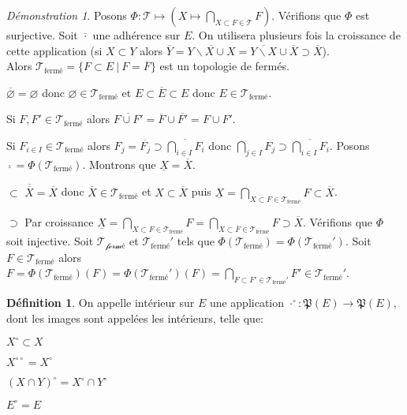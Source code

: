 \documentclass[a4paper, 11pt, french]{book}
\newenvironment{itemise}{\itemize}{\enditemize}
\theoremstyle{plain} %
\theoremstyle{definition} %
\newtheorem{definition}{Définition}
\theoremstyle{remark} %
\newtheorem*{demonstration}{Démonstration}
\renewcommand{\setminus}{\backslash}
\newcommand{\1}{\mathds{1}}
\newcommand\vide{\varnothing}
\newcommand\ens[2]{\{#1 \ |\ #2\}}
\begin{document}
\begin{demonstration}
	Posons $\Phi\colon\mathscr{T}\mapsto(X\mapsto\bigcap_{X\subset F\in\mathscr{T}}F)$.
	Vérifions que $\Phi$ est surjective.
	Soit $\overline{\cdot}$ une adhérence sur $E$.
	On utilisera plusieurs fois la croissance de cette application (si $X\subset Y$ alors $\overline{Y}=\overline{Y\setminus X\cup X}=\overline{Y\setminus X}\cup\overline{X}\supset\overline{X}$). \\
	Alors $\mathscr{T}_\text{fermé}=\ens{F\subset E}{F=\overline{F}}$ est un topologie de fermés.
	\begin{itemise}
		\item $\overline{\vide}=\vide$ donc $\vide\in\mathscr{T}_\text{fermé}$ et $E\subset\overline{E}\subset E$ donc $E\in\mathscr{T}_\text{fermé}$.
		\item Si $F, F'\in\mathscr{T}_\text{fermé}$ alors $\overline{F\cup F'}=\overline{F}\cup\overline{F'}=F\cup F'$.
		\item Si $F_{i\in I}\in\mathscr{T}_\text{fermé}$ alors $F_j=\overline{F_j}\supset\overline{\bigcap_{i\in I}F_i}$ donc $\bigcap_{j\in I}F_j\supset\overline{\bigcap_{i\in I}F_i}$.
	\end{itemise}
	Posons $\underline{\cdot}=\Phi(\mathscr{T}_\text{fermé})$.
	Montrons que $\underline{X}=\overline{X}$.
	\begin{itemise}
		\item[$\subset$] $\overline{\overline{X}}=\overline{X}$ donc $\overline{X}\in\mathscr{T}_\text{fermé}$ et $X\subset\overline{X}$ puis $\underline{X}=\bigcap_{X\subset F\in\mathscr{T}_\text{fermé}}F\subset\overline{X}$.
		\item[$\supset$] Par croissance $\underline{X}=\bigcap_{X\subset F\in\mathscr{T}_\text{fermé}}F=\bigcap_{\overline{X}\subset\overline{F}\in\mathscr{T}_\text{fermé}}F\supset\overline{X}$.
	\end{itemise}
	Vérifions que $\Phi$ soit injective.
	Soit $\mathscr{T_\text{fermé}}$ et $\mathscr{T}_\text{fermé}'$ tels que $\Phi(\mathscr{T}_\text{fermé})=\Phi(\mathscr{T}_\text{fermé}')$.
	Soit $F\in\mathscr{T}_\text{fermé}$ alors $F=\Phi(\mathscr{T}_\text{fermé})(F)=\Phi(\mathscr{T}_\text{fermé}')(F)=\bigcap_{F\subset F'\in\mathscr{T}_\text{fermé}'}F'\in\mathscr{T}_\text{fermé}'$.
\end{demonstration}

\begin{definition}
	On appelle intérieur sur $E$ une application $\cdot^\circ\colon\mathfrak{P}(E)\rightarrow\mathfrak{P}(E)$, dont les images sont appelées les intérieurs, telle que:
	\begin{itemise}
		\item $X^\circ\subset X$
		\item $X^{\circ\circ}=X^\circ$
		\item $(X\cap Y)^\circ=X^\circ\cap Y^\circ$
		\item $E^\circ=E$
	\end{itemise}
\end{definition}
\end{document}
